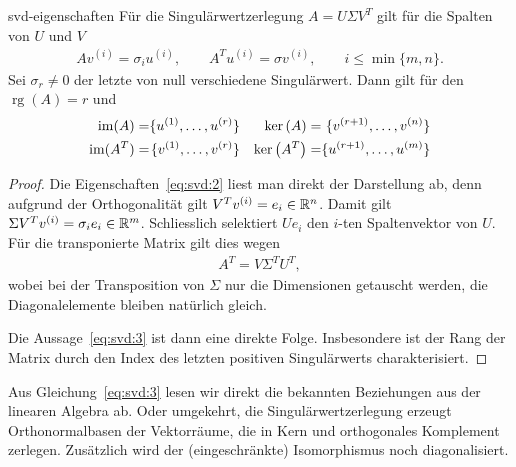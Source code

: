 \begin{Lemma}{svd-eigenschaften}
  Für die Singulärwertzerlegung $A=U\Sigma V^T$ gilt für die Spalten
  von $U$ und $V$
  \begin{gather}
    \label{eq:svd:2}
    A v^{(i)} = \sigma_i u^{(i)}, \qquad
    A^T u^{(i)} = \sigma v^{(i)},\qquad
    i \le \min\{m,n\}.
  \end{gather}
  Sei $\sigma_r\neq0$ der letzte von null verschiedene
  Singulärwert. Dann gilt für den  $\operatorname{rg}(A) = r$
  und
  \begin{gather}
    \label{eq:svd:3}
    \begin{aligned}
      \range A &= \span\{u^{(1)},\dots,u^{(r)}\}&&
      \ker A &= \span\{v^{(r+1)},\dots,v^{(n)}\}\\
      \range{A^T} &= \span\{v^{(1)},\dots,v^{(r)}\}&&
      \ker{A^T} &= \span\{u^{(r+1)},\dots,u^{(m)}\}
    \end{aligned}
  \end{gather}
\end{Lemma}

\begin{proof}
  Die Eigenschaften~\eqref{eq:svd:2} liest man direkt der Darstellung
  ab, denn aufgrund der Orthogonalität gilt
  $V^T v^{(i)} = e_i \in \mathbb R^n$. Damit gilt
  $\Sigma V^Tv^{(i)} = \sigma_i e_i \in \mathbb R^m$. Schliesslich selektiert
  $Ue_i$ den $i$-ten Spaltenvektor von $U$. Für die transponierte
  Matrix gilt dies wegen
  \begin{gather}
    A^T = V \Sigma^T U^T,
  \end{gather}
  wobei bei der Transposition von $\Sigma$ nur die Dimensionen
  getauscht werden, die Diagonalelemente bleiben natürlich gleich.

  Die Aussage~\eqref{eq:svd:3} ist dann eine direkte
  Folge. Insbesondere ist der Rang der Matrix durch den Index des
  letzten positiven Singulärwerts charakterisiert.
\end{proof}

\begin{remark}
  Aus Gleichung~\eqref{eq:svd:3} lesen wir direkt die bekannten
  Beziehungen aus der linearen Algebra ab. Oder umgekehrt, die
  Singulärwertzerlegung erzeugt Orthonormalbasen der Vektorräume, die
  in Kern und orthogonales Komplement zerlegen. Zusätzlich wird der
  (eingeschränkte) Isomorphismus noch diagonalisiert.
\end{remark}

